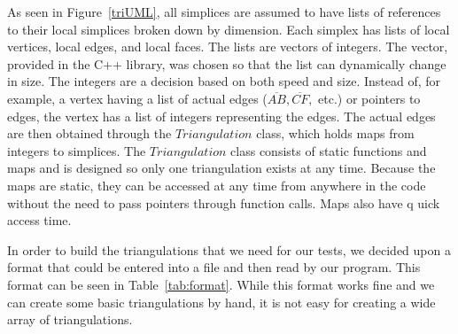 \documentclass[12pt]{article}
\begin{document}
 As seen in Figure~\ref{triUML}, all simplices are assumed to have lists of references to their local simplices broken down by dimension. Each simplex has lists of local vertices, local edges, and local faces. The lists are vectors of integers. The vector, provided in the C++ library, was chosen so that the list can dynamically change in size. The integers are a decision based on both speed and size. Instead of, for example, a vertex having a list of actual edges ($\overline{AB}, \overline{CF},$ etc.) or pointers to edges, the vertex has a list of integers representing the edges. The actual edges are then obtained through the $Triangulation$ class, which holds maps from integers to simplices. The $Triangulation$ class consists of static functions and maps and is designed so only one triangulation exists at any time. Because the maps are static, they can be accessed at any time from anywhere in the code without the need to pass pointers through function calls. Maps also have q
 uick access time.

 In order to build the triangulations that we need for our tests, we decided upon a format that could be entered into a file and then read by our program. This format can be seen in Table~\ref{tab:format}. While this format works fine and we can create some basic triangulations by hand, it is not easy for creating a wide array of triangulations.
\end{document}
